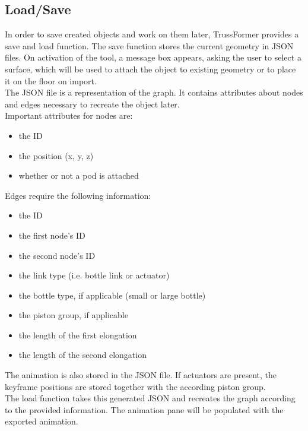 \subsection{Load/Save}
In order to save created objects and work on them later, TrussFormer provides a save and load function. The save function stores the current geometry in JSON files. On activation of the tool, a message box appears, asking the user to select a surface, which will be used to attach the object to existing geometry or to place it on the floor on import.\\
The JSON file is a representation of the graph. It contains attributes about nodes and edges necessary to recreate the object later.\\
Important attributes for nodes are:
\begin{itemize}
  \item the ID
  \item the position (x, y, z)
  \item whether or not a pod is attached
\end{itemize}
Edges require the following information:
\begin{itemize}
  \item the ID
  \item the first node's ID
  \item the second node's ID
  \item the link type (i.e. bottle link or actuator)
  \item the bottle type, if applicable (small or large bottle)
  \item the piston group, if applicable
  \item the length of the first elongation
  \item the length of the second elongation
\end{itemize}
The animation is also stored in the JSON file. If actuators are present, the keyframe positions are stored together with the according piston group.\\
The load function takes this generated JSON and recreates the graph according to the provided information. The animation pane will be populated with the exported animation.

